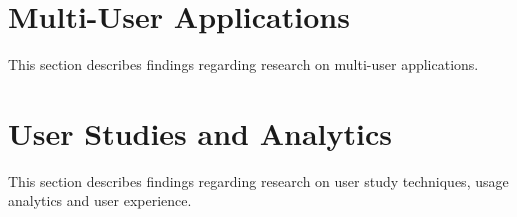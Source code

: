 \section{Multi-User Applications}

This section describes findings regarding research on multi-user applications.


\section{User Studies and Analytics}

This section describes findings regarding research on user study techniques, usage analytics and user experience.